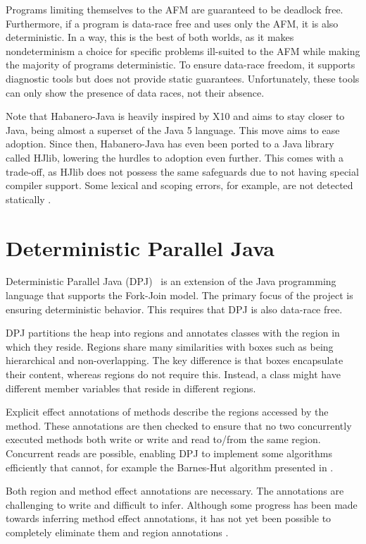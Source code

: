 Programs limiting themselves to the AFM are guaranteed to be deadlock free. Furthermore, if a program is data-race free and uses only the AFM, it is also deterministic. In a way, this is the best of both worlds, as it makes nondeterminism a choice for specific problems ill-suited to the AFM while making the majority of programs deterministic. To ensure data-race freedom, it supports diagnostic tools but does not provide static guarantees. Unfortunately, these tools can only show the presence of data races, not their absence.

Note that Habanero-Java is heavily inspired by X10 and aims to stay closer to Java, being almost a superset of the Java 5 language. This move aims to ease adoption. Since then, Habanero-Java has even been ported to a Java library called HJlib, lowering the hurdles to adoption even further. This comes with a trade-off, as HJlib does not possess the same safeguards due to not having special compiler support. Some lexical and scoping errors, for example, are not detected statically \cite{imam_habanero-java_2014}.


\section{Deterministic Parallel Java}
Deterministic Parallel Java (DPJ)~\cite{bocchino_type_2009} is an extension of the Java programming language that supports the Fork-Join model. The primary focus of the project is ensuring deterministic behavior. This requires that DPJ is also data-race free.

DPJ partitions the heap into regions and annotates classes with the region in which they reside. Regions share many similarities with boxes such as being hierarchical and non-overlapping. The key difference is that boxes encapsulate their content, whereas regions do not require this. Instead, a class might have different member variables that reside in different regions.

Explicit effect annotations of methods describe the regions accessed by the method. These annotations are then checked to ensure that no two concurrently executed methods both write or write and read to/from the same region. Concurrent reads are possible, enabling DPJ to implement some algorithms efficiently that \plc cannot, for example the Barnes-Hut algorithm presented in \cite{bocchino_type_2009}.

Both region and method effect annotations are necessary. The annotations are challenging to write and difficult to infer. Although some progress has been made towards inferring method effect annotations, it has not yet been possible to completely eliminate them and region annotations \cite{vakilian_inferring_2009}.


